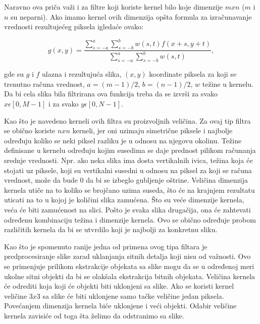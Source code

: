 \documentclass[a4paper,12pt,titlepage]{article}
\begin{document}
Naravno ova priča važi i za filtre koji koriste kernel bilo koje dimenzije $m x n$ ($m$ i $n$ su neparni). Ako imamo kernel ovih dimenzija opšta formula za izračunavanje vrednosti rezultujećeg piksela igledaće ovako: 

\begin{equation}\label{eq:smoot1}
g(x, y) = \dfrac{\sum_{s = -a}^{a} \sum_{s = -b}^{b} w(s, t)f(x + s, y + t)}{\sum_{s = -a}^{a} \sum_{s = -b}^{b} w(s, t)},  
\end{equation}

gde su $g$ i $f$ ulazna i rezultujuća slika, $(x, y)$ koordinate piksela za koji se trenutno računa vrednost, $a = (m - 1) / 2$, $b = (n - 1) / 2$, $w$ težine u kernelu. Da bi cela slika bila filtrirana ova funkcija treba da se izvrši za svako $x \epsilon [0, M - 1]$ i za svako $y \epsilon [0, N - 1]$. 

Kao što je navedeno kerneli ovih filtra su proizvoljnih veličina. Za ovaj tip filtra se obično koriste $n x n$ kerneli, jer oni uzimaju simetrične piksele i najbolje određuju koliko se neki piksel razliku je u odnosu na njegovu okolinu. Težine definisane u kernelu određuju kojim susedima se daje prednost pilikom računanja srednje vrednosti. Npr. ako neka slika ima dosta vertikalnih ivica, težina koja će stojati uz piksele, koji su vertikalni susedni u odnosu na piksel za koji se računa vrednost, može da bude 0 da bi se izbeglo gubljenje oštrine. Veličina dimenzija kernela utiče na to koliko se brojčano uzima suseda, što će na krajnjem rezultatu uticati na to u kojoj je količini slika zamućena. Što su veće dimenzije kernela, veća će biti zamućenost na slici. Pošto je svaka slika drugačija, ona će zahtevati određenu kombinaciju težina i dimenzije kernela. Ovo se obično određuje probom različitih kernela da bi se utvrdilo koji je najbolji za konkretnu sliku. 

Kao što je spomenuto ranije jedna od primena ovog tipa filtara je predprocesiranje slike zarad uklanjanja sitnih detalja koji nisu od važnosti. Ovo se primenjuje prilikom ekstrakcije objekata sa slike mogu da se u određenoj meri ukolne sitni objekti da bi se olakšala ekstrakcija bitnih objekata. Veličina kernela će odrediti koja koji će objekti biti uklonjeni sa slike. Ako se koristi kernel veličine $3 x 3$ sa slike će biti uklonjene samo tačke veličine jedan piksela. Povećanjem dimenzija kernela biće uklonjene i veći objekti. Odabir veličine kernela zavisiće od toga šta želimo da odstranimo sa slike.
\end{document}
